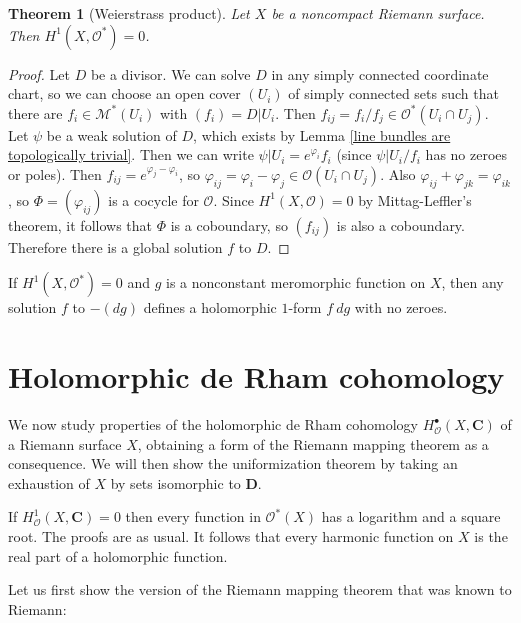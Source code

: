 \documentclass[reqno,12pt,letterpaper]{amsart}
\newcommand{\CC}{\mathbf{C}}
\newcommand{\DD}{\mathbf{D}}
\newcommand{\Olo}{\mathscr O}
\newcommand{\Mero}{\mathscr M}
\newtheorem{theorem}{Theorem}[section]
\theoremstyle{definition}
\begin{document}
\begin{theorem}[Weierstrass product]
\label{exp sheaf cohomology is trivial}
Let $X$ be a noncompact Riemann surface. Then $H^1(X, \Olo^*) = 0$.
\end{theorem}
\begin{proof}
Let $D$ be a divisor.
We can solve $D$ in any simply connected coordinate chart, so we can choose an open cover $(U_i)$ of simply connected sets such that there are $f_i \in \Mero^*(U_i)$ with $(f_i) = D|U_i$.
Then $f_{ij} = f_i/f_j \in \Olo^*(U_i \cap U_j)$.
Let $\psi$ be a weak solution of $D$, which exists by Lemma \ref{line bundles are topologically trivial}.
Then we can write $\psi|U_i = e^{\varphi_i} f_i$ (since $\psi|U_i/f_i$ has no zeroes or poles).
Then $f_{ij} = e^{\varphi_j - \varphi_i}$, so $\varphi_{ij} = \varphi_i - \varphi_j \in \Olo(U_i \cap U_j)$.
Also $\varphi_{ij} + \varphi_{jk} = \varphi_{ik}$, so $\Phi = (\varphi_{ij})$ is a cocycle for $\Olo$.
Since $H^1(X, \Olo) = 0$ by Mittag-Leffler's theorem, it follows that $\Phi$ is a coboundary, so $(f_{ij})$ is also a coboundary.
Therefore there is a global solution $f$ to $D$.
\end{proof}

If $H^1(X, \Olo^*) = 0$ and $g$ is a nonconstant meromorphic function on $X$, then any solution $f$ to $-(dg)$ defines a holomorphic $1$-form $f~dg$ with no zeroes.

\section{Holomorphic de Rham cohomology}
We now study properties of the holomorphic de Rham cohomology $H^\bullet_\Olo(X, \CC)$ of a Riemann surface $X$, obtaining a form of the Riemann mapping theorem as a consequence.
We will then show the uniformization theorem by taking an exhaustion of $X$ by sets isomorphic to $\DD$.

If $H^1_\Olo(X, \CC) = 0$ then every function in $\Olo^*(X)$ has a logarithm and a square root. The proofs are as usual.
It follows that every harmonic function on $X$ is the real part of a holomorphic function.

Let us first show the version of the Riemann mapping theorem that was known to Riemann:
\end{document}
